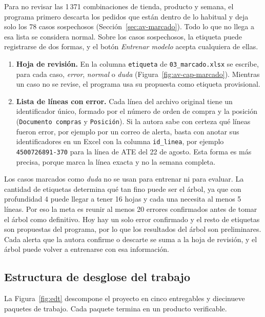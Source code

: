 Para no revisar las 1\,371 combinaciones de tienda, producto y semana, el programa primero descarta los pedidos que están dentro de lo habitual y deja solo los 78 casos sospechosos (Sección~\ref{sec:av-marcado}). Todo lo que no llega a esa lista se considera normal. Sobre los casos sospechosos, la etiqueta puede registrarse de dos formas, y el botón \emph{Entrenar modelo} acepta cualquiera de ellas.

\begin{enumerate}
\item \textbf{Hoja de revisión.} En la columna \texttt{etiqueta} de \texttt{03\_marcado.xlsx} se escribe, para cada caso, \emph{error}, \emph{normal} o \emph{duda} (Figura~\ref{fig:av-cap-marcado}). Mientras un caso no se revise, el programa usa su propuesta como etiqueta provisional.
\item \textbf{Lista de líneas con error.} Cada línea del archivo original tiene un identificador único, formado por el número de orden de compra y la posición (\texttt{Documento compras} y \texttt{Posición}). Si la autora sabe con certeza qué líneas fueron error, por ejemplo por un correo de alerta, basta con anotar sus identificadores en un Excel con la columna \texttt{id\_linea}, por ejemplo \texttt{4500726891-370} para la línea de ATE del 22 de agosto. Esta forma es más precisa, porque marca la línea exacta y no la semana completa.
\end{enumerate}

Los casos marcados como \emph{duda} no se usan para entrenar ni para evaluar. La cantidad de etiquetas determina qué tan fino puede ser el árbol, ya que con profundidad 4 puede llegar a tener 16 hojas y cada una necesita al menos 5 líneas. Por eso la meta es reunir al menos 20 errores confirmados antes de tomar el árbol como definitivo. Hoy hay un solo error confirmado y el resto de etiquetas son propuestas del programa, por lo que los resultados del árbol son preliminares. Cada alerta que la autora confirme o descarte se suma a la hoja de revisión, y el árbol puede volver a entrenarse con esa información.

\subsection{Estructura de desglose del trabajo}

La Figura~\ref{fig:edt} descompone el proyecto en cinco entregables y diecinueve paquetes de trabajo. Cada paquete termina en un producto verificable.

